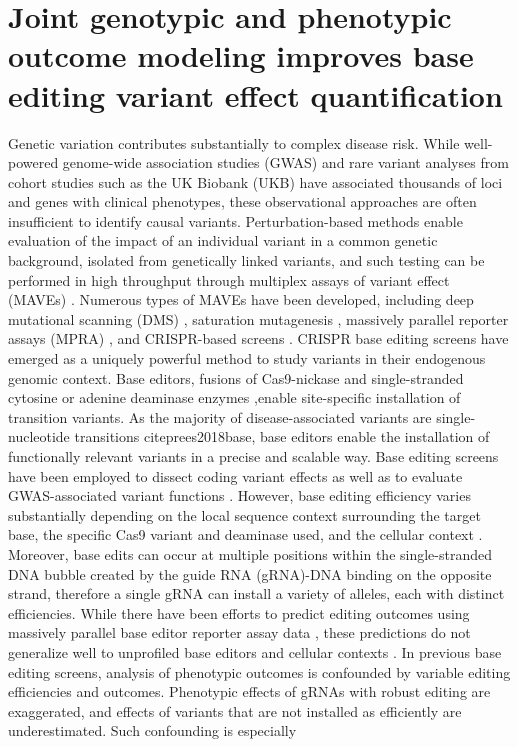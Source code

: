 \documentclass[a4paper, titlepage, openright]{book}
\begin{document}
\section{Joint genotypic and phenotypic outcome modeling improves base editing variant effect quantification}
Genetic variation contributes substantially to complex disease risk. While well-powered genome-wide association studies (GWAS) \citep{tam2019benefits}and rare variant analyses from cohort studies such as the UK Biobank (UKB) \citep{bycroft2018uk} have associated thousands of loci and genes with clinical phenotypes, these observational approaches are often insufficient to identify causal variants. Perturbation-based methods enable evaluation of the impact of an individual variant in a common genetic background, isolated from genetically linked variants, and such testing can be performed in high throughput through multiplex assays of variant effect (MAVEs) \citep{gasperini2016power}. Numerous types of MAVEs have been developed, including deep mutational scanning (DMS) \citep{araya2011deep},  saturation mutagenesis \citep{myers1986fine}, massively parallel reporter assays (MPRA) \citep{inoue2015decoding},  and CRISPR-based screens \citep{bock2022high, shalem2014genome, wang2014genetic}.  CRISPR base editing screens have emerged as a uniquely powerful method to study variants in their endogenous genomic context. Base editors, fusions of Cas9-nickase and single-stranded cytosine or adenine deaminase enzymes \citep{komor2016programmable, gaudelli2017programmable},enable site-specific installation of transition variants. As the majority of disease-associated variants are single-nucleotide transitions citep{rees2018base}, base editors enable the installation of functionally relevant variants in a precise and scalable way. Base editing screens have been employed to dissect coding variant effects as well as to evaluate GWAS-associated variant functions \citep{hanna2021massively, morris2023discovery, martin2023massively, cuella2021functional, pablo2023scanning, coelho2023base, cheng2021single, sanchez2022base, kim2022high, kweon2020crispr, huang2021identification, sangree2022benchmarking, lue2023base, despres2020perturbing, garcia2023base, lue2023base}. However, base editing efficiency varies substantially depending on the local sequence context surrounding the target base, the specific Cas9 variant and deaminase used, and the cellular context \citep{arbab2020determinants}. Moreover, base edits can occur at multiple positions within the single-stranded DNA bubble created by the guide RNA (gRNA)-DNA binding on the opposite strand, therefore a single gRNA can install a variety of alleles, each with distinct efficiencies. While there have been efforts to predict editing outcomes using massively parallel base editor reporter assay data \citep{arbab2020determinants}, these predictions do not generalize well to unprofiled base editors and cellular contexts \citep{sanchez2022base}. In previous base editing screens, analysis of phenotypic outcomes is confounded by variable editing efficiencies and outcomes. Phenotypic effects of gRNAs with robust editing are exaggerated, and effects of variants that are not installed as efficiently are underestimated. Such confounding is especially 
\end{document}
